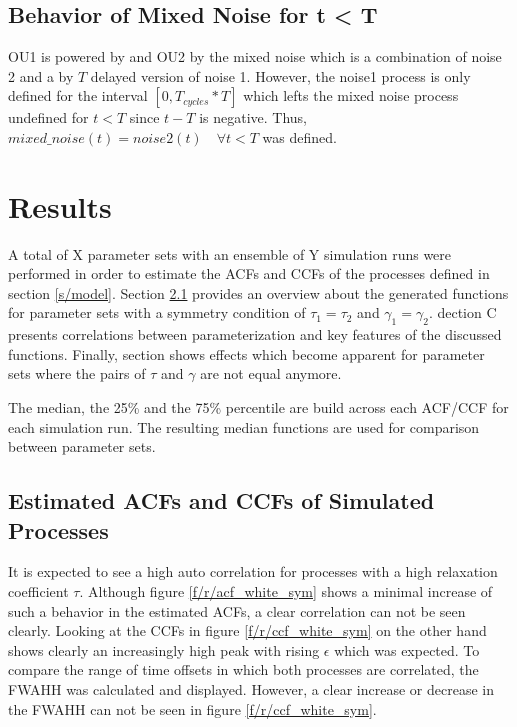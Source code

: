 \documentclass[a4paper,12pt]{book}
\theoremstyle{break}
\begin{document}
\section{Behavior of Mixed Noise for t < T}\label{s/meth/simulation}
OU1 is powered by  and OU2 by the mixed noise which is a combination of noise 2 and a by $T$ delayed version of noise 1.
However, the noise1 process is only defined for the interval $[0, T_{cycles} * T]$ which lefts the mixed noise process undefined for $t < T$ since $t - T$ is negative. 
Thus, $mixed\_noise(t) = noise2(t)  \quad \forall t < T$ was defined.



\chapter{Results}\label{ch/results}
A total of X parameter sets with an ensemble of Y simulation runs were performed in order to estimate the ACFs and CCFs of the processes defined in section \ref{s/model}. Section \ref{s/r/overview} provides an overview about the generated functions for parameter sets with a symmetry condition of $\tau_1 = \tau_2$ and $\gamma_1 = \gamma_2$. dection C presents correlations between parameterization and key features of the discussed functions. Finally, section shows effects which become apparent for parameter sets where the pairs of $\tau$ and $\gamma$ are not equal anymore.

The median, the 25\% and the 75\% percentile are build across each ACF/CCF for each simulation run. The resulting median functions are used for comparison between parameter sets.

\section{Estimated ACFs and CCFs of Simulated Processes}\label{s/r/overview}
It is expected to see a high auto correlation for processes with a high relaxation coefficient $\tau$. Although figure \ref{f/r/acf_white_sym} shows a minimal increase of such a behavior in the estimated ACFs, a clear correlation can not be seen clearly.
Looking at the CCFs in figure \ref{f/r/ccf_white_sym} on the other hand shows clearly an increasingly high peak  with rising $\epsilon$ which was expected.
To compare the range of time offsets in which both processes are correlated, the \ac{FWAHH} was calculated and displayed. However, a clear increase or decrease in the FWAHH can not be seen in figure \ref{f/r/ccf_white_sym}.
\end{document}
